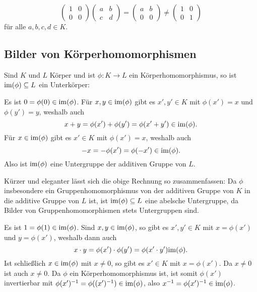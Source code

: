 \begin{enumerate}[leftmargin=*]
  \[
   \begin{pmatrix}
    1 & 0 \\
    0 & 0
   \end{pmatrix}
   \begin{pmatrix}
    a & b \\
    c & d
   \end{pmatrix}
   =
   \begin{pmatrix}
    a & b \\
    0 & 0
   \end{pmatrix}
   \neq
   \begin{pmatrix}
    1 & 0 \\
    0 & 1
   \end{pmatrix}
  \]
  für alle $a,b,c,d \in K$.
\end{enumerate}



\subsection{Bilder von Körperhomomorphismen}
Sind $K$ und $L$ Körper und ist $\phi \colon K \to L$ ein Körperhomomorphismus, so ist $\mathrm{im}(\phi) \subseteq L$ ein Unterkörper:

Es ist $0 = \phi(0) \in \mathrm{im}(\phi)$. Für $x,y \in \mathrm{im}(\phi)$ gibt es $x', y' \in K$ mit $\phi(x') = x$ und $\phi(y') = y$, weshalb auch
\[
 x+y
 = \phi(x')+\phi(y')
 = \phi(x'+y')
 \in \mathrm{im}(\phi).
\]
Für $x \in \mathrm{im}(\phi)$ gibt es $x' \in K$ mit $\phi(x') = x$, weshalb auch
\[
 -x
 = -\phi(x')
 = \phi(-x') \in \mathrm{im}(\phi).
\]
Also ist $\mathrm{im}(\phi)$ eine Untergruppe der additiven Gruppe von $L$.

\begin{bem}
 Kürzer und eleganter lässt sich die obige Rechnung so zusammenfassen: Da $\phi$ insbesondere ein Gruppenhomomorphismus von der additiven Gruppe von $K$ in die additive Gruppe von $L$ ist, ist $\mathrm{im}(\phi) \subseteq L$ eine abelsche Untergruppe, da Bilder von Gruppenhomomorphismen stets Untergruppen sind. 
\end{bem}

Es ist $1 = \phi(1) \in \mathrm{im}(\phi)$. Sind $x,y \in \mathrm{im}(\phi)$, so gibt es $x',y' \in K$ mit $x = \phi(x')$ und $y = \phi(x')$, weshalb dann auch
\[
 x \cdot y = \phi(x') \cdot \phi(y') = \phi(x' \cdot y') \mathrm{im}(\phi).
\]
Ist schließlich $x \in \mathrm{im}(\phi)$ mit $x \neq 0$, so gibt es $x' \in K$ mit $x = \phi(x')$. Da $x \neq 0$ ist auch $x \neq 0$. Da $\phi$ ein Körperhomomorphismus ist, ist somit $\phi(x')$ invertierbar mit $\phi(x')^{-1} = \phi((x')^{-1}) \in \mathrm{im}(\phi)$, also $x^{-1} = \phi(x')^{-1} \in \mathrm{im}(\phi)$.


